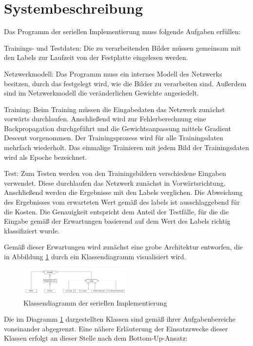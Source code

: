 \documentclass[../main.tex]{subfiles}
\begin{document}
\section{Systembeschreibung}
Das Programm der seriellen Implementierung muss folgende Aufgaben erfüllen: 
\begin{description}
\item{Trainings- und Testdaten:} Die zu verarbeitenden Bilder müssen gemeinsam mit den Labels zur Laufzeit von der Festplatte eingelesen werden. 
\item{Netzwerkmodell:} Das Programm muss ein internes Modell des Netzwerks besitzen, durch das festgelegt wird, wie die Bilder zu verarbeiten sind. Außerdem sind im Netzwerkmodell die veränderlichen Gewichte angesiedelt. 
\item{Training:} Beim Training müssen die Eingabedaten das Netzwerk zunächst vorwärts durchlaufen. Anschließend wird zur Fehlerberechnung eine Backpropagation durchgeführt und die Gewichtsanpassung mittels Gradient Descent vorgenommen. 
Der Trainingsprozess wird für alle Trainingsdaten mehrfach wiederholt. Das einmalige Trainieren mit jedem Bild der Trainingsdaten wird als Epoche bezeichnet. 
\item{Test:} Zum Testen werden von den Trainingsbildern verschiedene Eingaben verwendet. Diese durchlaufen das Netzwerk zunächst in Vorwärtsrichtung. Anschließend werden die Ergebnisse mit den Labels verglichen. Die Abweichung des Ergebnisses vom erwarteten Wert gemäß des labels ist ausschlaggebend für die Kosten. Die Genauigkeit entspricht dem Anteil der Testfälle, für die die Eingabe gemäß der Erwartungen basierend auf dem Wert des Labels richtig klassifiziert wurde. 
\end{description}
Gemäß dieser Erwartungen wird zunächst eine grobe Architektur entworfen, die in Abbildung \ref{pic:cnn_serial_classes} durch ein Klassendiagramm visualisiert wird. 
\begin{figure}
    \centering 
       \includegraphics[width=0.5\textwidth]{../images/Schmidt/CNN_Serial_Classes.jpg} 
    \caption {Klassendiagramm der seriellen Implementierung} 
    \label{pic:cnn_serial_classes} 
\end{figure} 
Die im Diagramm \ref{pic:cnn_serial_classes} dargestellten Klassen sind gemäß ihrer Aufgabenbereiche voneinander abgegrenzt. Eine nähere Erläuterung der Einsatzzwecke dieser Klassen erfolgt an dieser Stelle nach dem Bottom-Up-Ansatz: 
\end{document}
